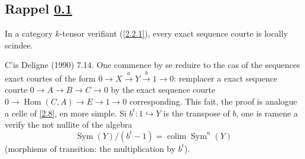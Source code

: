 \documentclass[11pt,a4paper]{article}
\theoremstyle{plain}
\theoremstyle{definition}
\DeclareMathOperator{\Hom}{Hom}
\DeclareMathOperator{\Sym}{Sym}
\DeclareMathOperator*{\colim}{colim}
\begin{document}
\subsection{Rappel \ref{2.10}}\label{2.10}

In a category $k$-tensor verifiant (\ref{2.2.1}), every exact sequence courte is locally scindee.

C'is Deligne (1990) 7.14. One commence by se reduire to the cas of the sequences exact courtes of the form $0\to X\xrightarrow{a}Y\xrightarrow{b}1\to0$: remplacer a exact sequence courte $0\to A\to B\to C\to0$ by the exact sequence courte $0\to\Hom(C,A)\to E\to1\to0$ corresponding. This fait, the proof is analogue a celle of \ref{2.8}, en more simple. Si $b^t:1\hookrightarrow Y$ is the transpose of $b$, one is ramene a verify the not nullite of the algebra
\[
\Sym(Y)/(b^t-1)=\colim\Sym^n(Y)
\]
(morphisms of transition: the multiplication by $b^t$).
\end{document}

